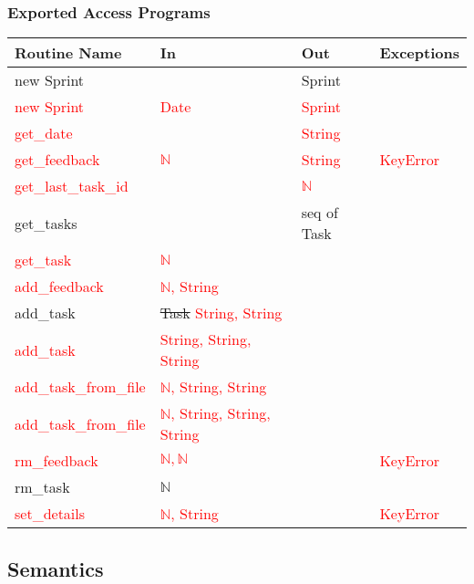 \documentclass[12pt, titlepage]{article}
\begin{document}
\subsubsection* {Exported Access Programs}
\begin{tabular}{|l|l|l|l|}
    \hline
    \textbf{Routine Name} & \textbf{In} & \textbf{Out} & \textbf{Exceptions} \\
    \hline
    new Sprint & & Sprint & \\
    \hline
    \textcolor{red}{new Sprint} & \textcolor{red}{Date} & \textcolor{red}{Sprint} & \\
    \hline
    \textcolor{red}{get\_date} &  & \textcolor{red}{String} & \\
    \hline
    \textcolor{red}{get\_feedback} & \textcolor{red}{$\mathbb{N}$}& \textcolor{red}{String} & \textcolor{red}{KeyError}\\
    \hline
    \textcolor{red}{get\_last\_task\_id} & & \textcolor{red}{$\mathbb{N}$}& \\
    \hline
    get\_tasks & & seq of Task &\\
    \hline
    \textcolor{red}{get\_task} & \textcolor{red}{$\mathbb{N}$}& &\\
    \hline
    \textcolor{red}{add\_feedback} & \textcolor{red}{$\mathbb{N}$, String} & &\\
    \hline
    add\_task & \sout{Task} \textcolor{red}{String, String} & & \\
    \hline
    \textcolor{red}{add\_task} & \textcolor{red}{String, String, String} & & \\
    \hline
    \textcolor{red}{add\_task\_from\_file} & \textcolor{red}{$\mathbb{N}$, String, String} & & \\
    \hline
    \textcolor{red}{add\_task\_from\_file} & \textcolor{red}{$\mathbb{N}$, String, String, String} & &\\
    \hline
    \textcolor{red}{rm\_feedback} & \textcolor{red}{$\mathbb{N,N}$}& & \textcolor{red}{KeyError}\\
    \hline
    rm\_task & $\mathbb{N}$ & &\\
    \hline
    \textcolor{red}{set\_details} & \textcolor{red}{$\mathbb{N}$, String} & & \textcolor{red}{KeyError}\\
    \hline
\end{tabular}

\subsection*{Semantics}
\end{document}
